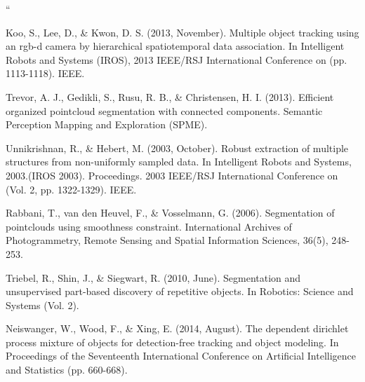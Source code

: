 \documentclass[twoside,hidelinks]{article}
\begin{document}
\begin{thebibliography}{9}




``

\newblock Koo, S., Lee, D., \& Kwon, D. S. (2013, November). Multiple object tracking using an rgb-d camera by hierarchical spatiotemporal data association. In Intelligent Robots and Systems (IROS), 2013 IEEE/RSJ International Conference on (pp. 1113-1118). IEEE.

\newblock Trevor, A. J., Gedikli, S., Rusu, R. B., \& Christensen, H. I. (2013). Efficient organized pointcloud segmentation with connected components. Semantic Perception Mapping and Exploration (SPME).

\newblock Unnikrishnan, R., \& Hebert, M. (2003, October). Robust extraction of multiple structures from non-uniformly sampled data. In Intelligent Robots and Systems, 2003.(IROS 2003). Proceedings. 2003 IEEE/RSJ International Conference on (Vol. 2, pp. 1322-1329). IEEE. 

\newblock Rabbani, T., van den Heuvel, F., \& Vosselmann, G. (2006). Segmentation of pointclouds using smoothness constraint. International Archives of Photogrammetry, Remote Sensing and Spatial Information Sciences, 36(5), 248-253.

\newblock Triebel, R., Shin, J., \& Siegwart, R. (2010, June). Segmentation and unsupervised part-based discovery of repetitive objects. In Robotics: Science and Systems (Vol. 2).

\newblock Neiswanger, W., Wood, F., \& Xing, E. (2014, August). The dependent dirichlet process mixture of objects for detection-free tracking and object modeling. In Proceedings of the Seventeenth International Conference on Artificial Intelligence and Statistics (pp. 660-668).


\end{thebibliography}
\end{document}

